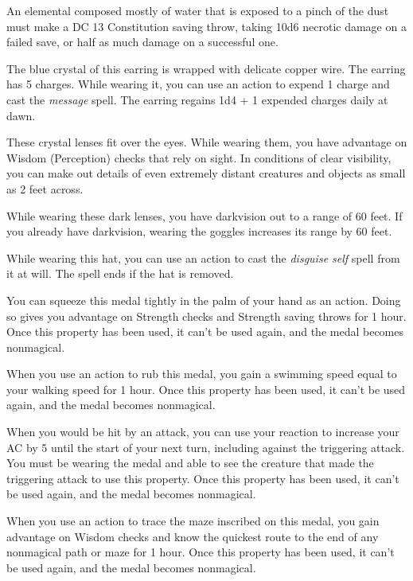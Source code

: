 \documentclass[10pt,a4paper,twoside,fancy,bg=print,twocolumn,openany,nodeprecatedcode]{dndbook}
\begin{document}
An elemental composed mostly of water that is exposed to a pinch of the dust must make a DC 13 Constitution saving throw, taking 10d6 necrotic damage on a failed save, or half as much damage on a successful one.

The blue crystal of this earring is wrapped with delicate copper wire. The earring has 5 charges. While wearing it, you can use an action to expend 1 charge and cast the \textit{message} spell. The earring regains 1d4 + 1 expended charges daily at dawn.

These crystal lenses fit over the eyes. While wearing them, you have advantage on Wisdom (Perception) checks that rely on sight. In conditions of clear visibility, you can make out details of even extremely distant creatures and objects as small as 2 feet across.

While wearing these dark lenses, you have darkvision out to a range of 60 feet. If you already have darkvision, wearing the goggles increases its range by 60 feet.

While wearing this hat, you can use an action to cast the \textit{disguise self} spell from it at will. The spell ends if the hat is removed.

You can squeeze this medal tightly in the palm of your hand as an action. Doing so gives you advantage on Strength checks and Strength saving throws for 1 hour. Once this property has been used, it can't be used again, and the medal becomes nonmagical.

When you use an action to rub this medal, you gain a swimming speed equal to your walking speed for 1 hour. Once this property has been used, it can't be used again, and the medal becomes nonmagical.

When you would be hit by an attack, you can use your reaction to increase your AC by 5 until the start of your next turn, including against the triggering attack. You must be wearing the medal and able to see the creature that made the triggering attack to use this property. Once this property has been used, it can't be used again, and the medal becomes nonmagical.

When you use an action to trace the maze inscribed on this medal, you gain advantage on Wisdom checks and know the quickest route to the end of any nonmagical path or maze for 1 hour. Once this property has been used, it can't be used again, and the medal becomes nonmagical.
\end{document}
